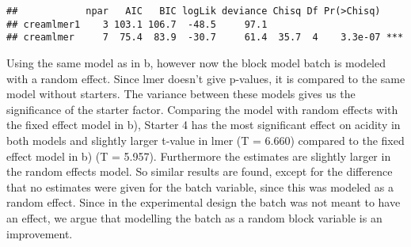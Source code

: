 \documentclass[
]{article}
\begin{document}
\begin{verbatim}
##            npar   AIC   BIC logLik deviance Chisq Df Pr(>Chisq)    
## creamlmer1    3 103.1 106.7  -48.5     97.1                        
## creamlmer     7  75.4  83.9  -30.7     61.4  35.7  4    3.3e-07 ***
\end{verbatim}

Using the same model as in b, however now the block model batch is
modeled with a random effect. Since lmer doesn't give p-values, it is
compared to the same model without starters. The variance between these
models gives us the significance of the starter factor. Comparing the
model with random effects with the fixed effect model in b), Starter 4
has the most significant effect on acidity in both models and slightly
larger t-value in lmer (T = 6.660) compared to the fixed effect model in
b) (T = 5.957). Furthermore the estimates are slightly larger in the
random effects model. So similar results are found, except for the
difference that no estimates were given for the batch variable, since
this was modeled as a random effect. Since in the experimental design
the batch was not meant to have an effect, we argue that modelling the
batch as a random block variable is an improvement.
\end{document}

